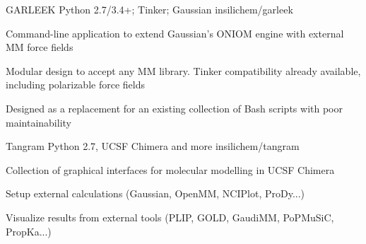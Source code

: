 \begin{cventries}
  \projectentry
    {GARLEEK} %
    {Python 2.7/3.4+; Tinker; Gaussian} %
    {} %
    {insilichem/garleek} %
    {
      \begin{cvitems} %
        \item {Command-line application to extend Gaussian's ONIOM engine with external MM force fields}
        \item {Modular design to accept any MM library. Tinker compatibility already available, including polarizable force fields}
        \item {Designed as a replacement for an existing collection of Bash scripts with poor maintainability}
      \end{cvitems}
    }

  \projectentry
    {Tangram} %
    {Python 2.7, UCSF Chimera and more} %
    {} %
    {insilichem/tangram} %
    {
      \begin{cvitems} %
        \item {Collection of graphical interfaces for molecular modelling in UCSF Chimera}
        \item {Setup external calculations (Gaussian, OpenMM, NCIPlot, ProDy...)}
        \item {Visualize results from external tools (PLIP, GOLD, GaudiMM, PoPMuSiC, PropKa...)}
      \end{cvitems}
    }
\end{cventries}
